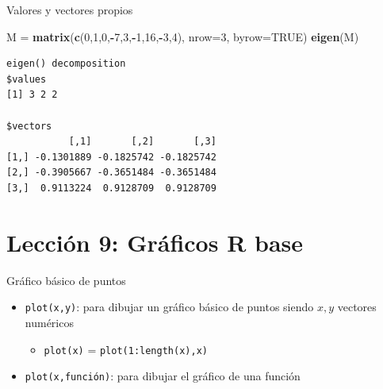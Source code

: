 \documentclass[
  ignorenonframetext,
  aspectratio=169]{beamer}
\newenvironment{Shaded}{\begin{snugshade}}{\end{snugshade}}
\newcommand{\AttributeTok}[1]{\textcolor[rgb]{0.13,0.29,0.53}{#1}}
\newcommand{\ConstantTok}[1]{\textcolor[rgb]{0.56,0.35,0.01}{#1}}
\newcommand{\DecValTok}[1]{\textcolor[rgb]{0.00,0.00,0.81}{#1}}
\newcommand{\FunctionTok}[1]{\textcolor[rgb]{0.13,0.29,0.53}{\textbf{#1}}}
\newcommand{\NormalTok}[1]{#1}
\newcommand{\OtherTok}[1]{\textcolor[rgb]{0.56,0.35,0.01}{#1}}
\newcommand{\SpecialCharTok}[1]{\textcolor[rgb]{0.81,0.36,0.00}{\textbf{#1}}}
\providecommand{\tightlist}{%
  \setlength{\itemsep}{0pt}\setlength{\parskip}{0pt}}
\begin{document}
\begin{frame}[fragile]{Valores y vectores propios}
\label{valores-y-vectores-propios-4}
\begin{Shaded}
\begin{Highlighting}[]
\NormalTok{M }\OtherTok{=} \FunctionTok{matrix}\NormalTok{(}\FunctionTok{c}\NormalTok{(}\DecValTok{0}\NormalTok{,}\DecValTok{1}\NormalTok{,}\DecValTok{0}\NormalTok{,}\SpecialCharTok{{-}}\DecValTok{7}\NormalTok{,}\DecValTok{3}\NormalTok{,}\SpecialCharTok{{-}}\DecValTok{1}\NormalTok{,}\DecValTok{16}\NormalTok{,}\SpecialCharTok{{-}}\DecValTok{3}\NormalTok{,}\DecValTok{4}\NormalTok{), }\AttributeTok{nrow=}\DecValTok{3}\NormalTok{, }\AttributeTok{byrow=}\ConstantTok{TRUE}\NormalTok{)}
\FunctionTok{eigen}\NormalTok{(M)}
\end{Highlighting}
\end{Shaded}

\begin{verbatim}
eigen() decomposition
$values
[1] 3 2 2

$vectors
           [,1]       [,2]       [,3]
[1,] -0.1301889 -0.1825742 -0.1825742
[2,] -0.3905667 -0.3651484 -0.3651484
[3,]  0.9113224  0.9128709  0.9128709
\end{verbatim}
\end{frame}

\section{Lección 9: Gráficos R
base}\label{lecciuxf3n-9-gruxe1ficos-r-base}

\begin{frame}[fragile]{Gráfico básico de puntos}
\label{gruxe1fico-buxe1sico-de-puntos}
\begin{itemize}
\tightlist
\item
  \texttt{plot(x,y)}: para dibujar un gráfico básico de puntos siendo
  \(x,y\) vectores numéricos

  \begin{itemize}
  \tightlist
  \item
    \texttt{plot(x)} = \texttt{plot(1:length(x),x)}
  \end{itemize}
\item
  \texttt{plot(x,función)}: para dibujar el gráfico de una función
\end{itemize}
\end{frame}
\end{document}
